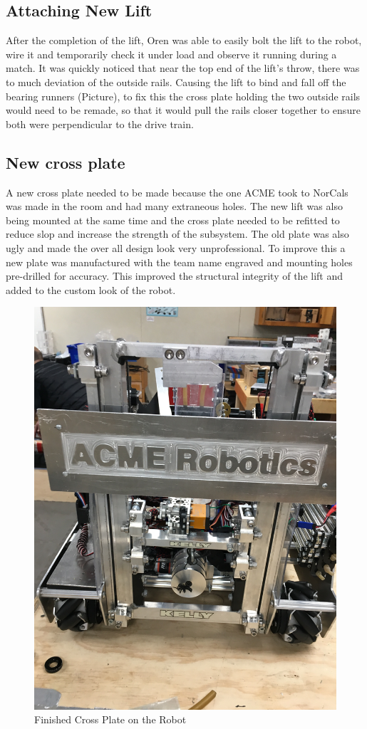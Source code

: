 \documentclass{article}
\begin{document}
\subsection{Attaching New Lift}
After the completion of the lift, Oren was able to easily bolt the lift to the robot, wire it and temporarily check it under load and observe it running during a match. It was quickly noticed that near the top end of the lift's throw, there was to much deviation of the outside rails. Causing the lift to bind and fall off the bearing runners (Picture), to fix this the cross plate holding the two outside rails would need to be remade, so that it would pull the rails closer together to ensure both were perpendicular to the drive train. 

\subsection{New cross plate}
  A new cross plate needed to be made because the one ACME took to NorCals was made in the room and had many extraneous holes. The new lift was also being mounted at the same time and the cross plate needed to be refitted to reduce slop and increase the strength of the subsystem. The old plate was also ugly and made the over all design look very unprofessional. To improve this a new plate was manufactured with the team name engraved and mounting holes pre-drilled for accuracy. This improved the structural integrity of the lift and added to the custom look of the robot.
  
  \begin{figure}
    \centering
    \includegraphics[width= 0.5 \textwidth, angle=270]{28_03-11/images/crossplate.JPG}
    \caption{Finished Cross Plate on the Robot}
    \label{fig:plate}
\end{figure}

 
\end{document}
